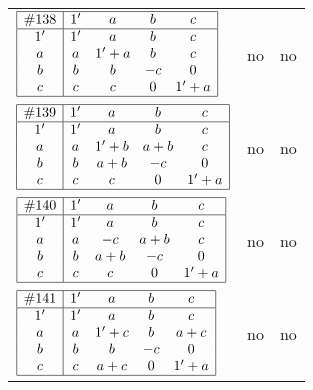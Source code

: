 \documentclass[12pt]{article}
\newcommand{\join}{\mathbin{+}}%
\newcommand{\id}{{1'}}%
\begin{document}
\begin{center}
\begin{longtable}{l|c|c}
$
\begin{array}{|c|cccc|} \hline
\#138 & \id & a & b & c \\ \hline
\id & \id & a & b & c \\
a & a & \id \join a & b & c \\
b & b & b & -c & 0 \\
c & c & c & 0 & \id \join a \\ \hline
\end{array}
$
 & no  
 & no      \\[15mm]

$
\begin{array}{|c|cccc|} \hline
\#139 & \id & a & b & c \\ \hline
\id & \id & a & b & c \\
a & a & \id \join b & a \join b & c \\
b & b & a \join b & -c & 0 \\
c & c & c & 0 & \id \join a \\ \hline
\end{array}
$
 & no  
 & no      \\[15mm]

$
\begin{array}{|c|cccc|} \hline
\#140 & \id & a & b & c \\ \hline
\id & \id & a & b & c \\
a & a & -c & a \join b & c \\
b & b & a \join b & -c & 0 \\
c & c & c & 0 & \id \join a \\ \hline
\end{array}
$
 & no  
 & no      \\[15mm]

$
\begin{array}{|c|cccc|} \hline
\#141 & \id & a & b & c \\ \hline
\id & \id & a & b & c \\
a & a & \id \join c & b & a \join c \\
b & b & b & -c & 0 \\
c & c & a \join c & 0 & \id \join a \\ \hline
\end{array}
$
 & no  
 & no      \\[15mm]


\end{longtable}
\end{center}
\end{document}
